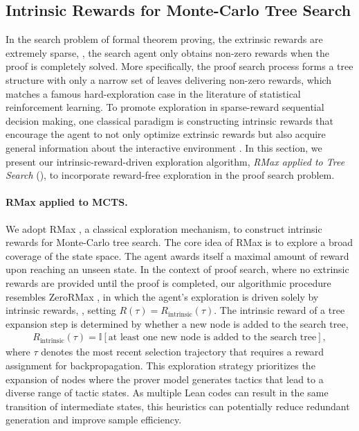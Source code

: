 \subsection{Intrinsic Rewards for Monte-Carlo Tree Search} \label{sec:rmax}

In the search problem of formal theorem proving, the extrinsic rewards are extremely sparse, \ie, the search agent only obtains non-zero rewards when the proof is completely solved.
More specifically, the proof search process forms a tree structure with only a narrow set of leaves delivering non-zero rewards, which matches a famous hard-exploration case \citep{krishnamurthy2016pac} in the literature of statistical reinforcement learning.
To promote exploration in sparse-reward sequential decision making, one classical paradigm is constructing intrinsic rewards \citep{schmidhuber2010formal} that encourage the agent to not only optimize extrinsic rewards but also acquire general information about the interactive environment \citep{bellemare2016unifying, houthooft2016vime, pathak2017curiosity, burda2019exploration}.
In this section, we present our intrinsic-reward-driven exploration algorithm, \textit{RMax applied to Tree Search} (\treesearch), to incorporate reward-free exploration in the proof search problem.

\paragraph{RMax applied to MCTS.}
We adopt RMax \citep{brafman2002r}, a classical exploration mechanism, to construct intrinsic rewards for Monte-Carlo tree search.
The core idea of RMax is to explore a broad coverage of the state space.
The agent awards itself a maximal amount of reward upon reaching an unseen state.
In the context of proof search, where no extrinsic rewards are provided until the proof is completed, our algorithmic procedure resembles ZeroRMax \citep{jin2020reward}, in which the agent's exploration is driven solely by intrinsic rewards, \ie, setting $R(\tau)=R_{\text{intrinsic}}(\tau)$.
The intrinsic reward of a tree expansion step is determined by whether a new node is added to the search tree,
\begin{align}\label{eq:rmax_reward}
    R_{\text{intrinsic}}(\tau) = \mathbb{I}\left[\text{at least one new node is added to the search tree}\right],
\end{align}
where $\tau$ denotes the most recent selection trajectory that requires a reward assignment for backpropagation.
This exploration strategy prioritizes the expansion of nodes where the prover model generates tactics that lead to a diverse range of tactic states.
As multiple Lean codes can result in the same transition of intermediate states, this heuristics can potentially reduce redundant generation and improve sample efficiency.

